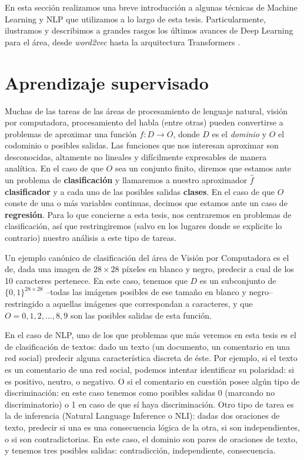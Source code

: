 En esta sección realizamos una breve introducción a algunas técnicas de Machine Learning y NLP que utilizamos a lo largo de esta tesis. Particularmente, ilustramos y describimos a grandes rasgos los últimos avances de Deep Learning para el área, desde \emph{word2vec} \cite{mikolov2013distributed} hasta la arquitectura Transformers \cite{vaswani2017attention}.

\section{Aprendizaje supervisado}

Muchas de las tareas de las áreas de procesamiento de lenguaje natural, visión por computadora, procesamiento del habla (entre otras) pueden convertirse a problemas de aproximar una función $f: D \rightarrow O$, donde $D$ es el \emph{dominio} y $O$ el codominio o posibles salidas. Las funciones que nos interesan aproximar son desconocidas, altamente no lineales y difícilmente expresables de manera analítica. En el caso de que $O$ sea un conjunto finito, diremos que estamos ante un problema de \textbf{clasificación} y llamaremos a nuestro aproximador $\widehat{f}$ \textbf{clasificador} y a cada uno de las posibles salidas \textbf{clases}. En el caso de que $O$ conste de una o más variables continuas, decimos que estamos ante un caso de \textbf{regresión}. Para lo que concierne a esta tesis, nos centraremos en problemas de clasificación, así que restringiremos (salvo en los lugares donde se explicite lo contrario) nuestro análisis a este tipo de tareas.

Un ejemplo canónico de clasificación del área de Visión por Computadora es el de, dada una imagen de $28 \times 28$ píxeles en blanco y negro, predecir a cual de los 10 caracteres pertenece. En este caso, tenemos que $D$ es un subconjunto de $\{0, 1\}^{28 \times 28}$ --todas las imágenes posibles de ese tamaño en blanco y negro-- restringido a aquellas imágenes que correspondan a caracteres, y que $O = {0, 1, 2, \ldots, 8, 9}$ son las posibles salidas de esta función.

En el caso de NLP, uno de los que problemas que más veremos en esta tesis es el de clasificación de textos: dado un texto (un documento, un comentario en una red social) predecir alguna característica discreta de éste. Por ejemplo, si el texto es un comentario de una red social, podemos intentar identificar su polaridad: si es positivo, neutro, o negativo. O si el comentario en cuestión posee algún tipo de discriminación: en este caso tenemos como posibles salidas 0 (marcando no discriminatorio) o 1 en caso de que sí haya discriminación. Otro tipo de tarea es la de inferencia (Natural Language Inference o NLI): dadas dos oraciones de texto, predecir si una es una consecuencia lógica de la otra, si son independientes, o si son contradictorias. En este caso, el dominio son pares de oraciones de texto, y tenemos tres posibles salidas: contradicción, independiente, consecuencia.

